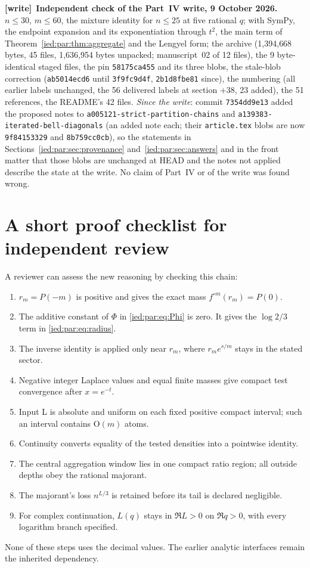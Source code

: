 \documentclass[11pt,letterpaper]{article}
\theoremstyle{remark}\newtheorem{remark}[theorem]{Remark}
\newcommand{\Oh}{\mathrm O}\newcommand{\supp}{\operatorname{supp}}
\newcommand{\file}[1]{\nolinkurl{#1}}
\newenvironment{writenote}[1][]{\par\smallskip\begingroup\small
 \noindent\textbf{[write]}\if\relax\detokenize{#1}\relax\else~\textbf{#1.}\fi\ }%
 {\par\endgroup\smallskip}
\begin{document}
\begin{writenote}[Independent check of the Part~IV write, 9 October 2026]
$n\le30$, $m\le60$, the mixture identity for $n\le25$ at five rational $q$; with SymPy, the
endpoint expansion and its exponentiation through $t^2$, the main term of
Theorem~\ref{ied:par:thm:aggregate} and the Lengyel form; the archive (1{,}394{,}668 bytes, 45
files, 1{,}636{,}954 bytes unpacked; manuscript~02 of 12 files), the 9 byte-identical staged
files, the pin \file{58175ca455} and its three blobs, the stale-blob correction
(\file{ab5014ecd6} until \file{3f9fc9d4f}, \file{2b1d8fbe81} since), the numbering (all
earlier labels unchanged, the 56 delivered labels at section $+38$, 23 added), the 51
references, the README's 42 files. \emph{Since the write}: commit \file{7354dd9e13} added the
proposed notes to \file{a005121-strict-partition-chains} and
\file{a139383-iterated-bell-diagonals} (an added note each; their \file{article.tex} blobs are
now \file{9f84153329} and \file{8b759cc0cb}), so the statements in
Sections~\ref{ied:par:sec:provenance} and~\ref{ied:par:sec:answers} and in the front matter
that those blobs are unchanged at HEAD and the notes not applied describe the state at the
write. No claim of Part~IV or of the write was found wrong.
\end{writenote}

\appendix
\section{A short proof checklist for independent review}\label{ied:par:app:checklist}
A reviewer can assess the new reasoning by checking this chain:
\begin{enumerate}[leftmargin=*,itemsep=3pt]
\item $r_m=P(-m)$ is positive and gives the exact mass
$f^{\circ m}(r_m)=P(0)$.
\item The additive constant of $\Phi$ in \eqref{ied:par:eq:Phi} is zero.
It gives the $\log2/3$ term in \eqref{ied:par:eq:radius}.
\item The inverse identity is applied only near $r_m$, where
$r_m e^{s/m}$ stays in the stated sector.
\item Negative integer Laplace values and equal finite masses give
compact test convergence after $x=e^{-t}$.
\item Input L is absolute and uniform on each fixed positive compact
interval; such an interval contains $\Oh(m)$ atoms.
\item Continuity converts equality of the tested densities into a
pointwise identity.
\item The central aggregation window lies in one compact ratio
region; all outside depths obey the rational majorant.
\item The majorant's loss $n^{L/3}$ is retained before its tail is
declared negligible.
\item For complex continuation, $L(q)$ stays in $\Re L>0$ on
$\Re q>0$, with every logarithm branch specified.
\end{enumerate}
None of these steps uses the decimal values.
The earlier analytic interfaces remain the inherited dependency.
\end{document}
